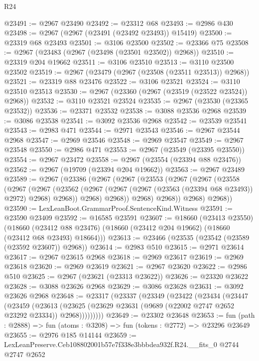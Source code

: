 \begin{lexlean}{R24}
\begin{coremodule}
@23491 := @2967 @23490
@23492 := @23312 @68
@23493 := @2986 @430
@23498 := @2967 (@2967 (@23491 (@23492 @23493)) @15419)
@23500 := @23319 @68 @23493
@23501 := @3106 @23500
@23502 := @23366 @75
@23508 := @2967 (@23483 (@2967 (@23498 (@23501 @23502)) @2968))
@23510 := @23319 @204 @19662
@23511 := @3106 @23510
@23513 := @3110 @23500 @23502
@23519 := @2967 (@23479 (@2967 (@23508 (@23511 @23513)) @2968))
@23521 := @23319 @88 @23476
@23522 := @3106 @23521
@23524 := @3110 @23510 @23513
@23530 := @2967 (@23360 (@2967 (@23519 (@23522 @23524)) @2968))
@23532 := @3110 @23521 @23524
@23535 := @2967 (@23530 (@23365 @23532))
@23536 := @23371 @23532
@23538 := @3088 @23536 @2968
@23539 := @3086 @23538
@23541 := @3092 @23536 @2968
@23542 := @23539 @23541
@23543 := @2983 @471
@23544 := @2971 @23543
@23546 := @2967 @23544 @2968
@23547 := @2969 @23546
@23548 := @2969 @23547
@23549 := @2967 @23548
@23550 := @2986 @471
@23553 := @2967 (@23549 (@23395 @23550))
@23554 := @2967 @23472
@23558 := @2967 (@23554 (@23394 @88 @23476))
@23562 := @2967 (@19709 (@23394 @204 @19662))
@23563 := @2967 @23489
@23589 := @2967
    (@23386
      (@2967
        (@2967
          (@23553
            (@2967
              (@2967
                (@23558
                  (@2967
                    (@2967
                      (@23562
                        (@2967 (@2967 (@2967 (@23563 (@23394 @68 @23493)) @2972) @2968) @2968))
                      @2968)
                    @2968))
                @2968)
              @2968))
          @2968)
        @2968))
@23590 := LexLeanBoot.GrammarProof.SentenceKind.Witness
@23591 := @23590 @23409
@23592 := @16585 @23591
@23607 := @18660
    (@23413 @23550)
    (@18660 (@23412 @88 @23476) (@18660 (@23412 @204 @19662) (@18660 (@23412 @68 @23493) @18664)))
@23613 := @23466 (@23535 (@23542 (@23589 (@23592 @23607)) @2968))
@23614 := @2983 @510
@23615 := @2971 @23614
@23617 := @2967 @23615 @2968
@23618 := @2969 @23617
@23619 := @2969 @23618
@23620 := @2969 @23619
@23621 := @2967 @23620
@23622 := @2986 @510
@23625 := @2967 (@23621 (@23313 @23622))
@23626 := @23320 @23622
@23628 := @3088 @23626 @2968
@23629 := @3086 @23628
@23631 := @3092 @23626 @2968
@23648 := @23317
    (@23337
      (@23349
        (@23422
          (@23434
            (@23447
              (@23459
                (@23613
                  (@23625 (@23629 @23631 (@9689 (@22002 @2747 @2652 @23292 @23334)) @2968)))))))))
@23649 := @23302 @23648
@23653 := fun (path : @2888) => fun (atoms : @3208) => fun (tokens : @2772) => @23296 @23649
@23655 := @2976 @185 @14144
@23659 := LexLeanPreserve.Ceb108802001b57e7f338e3bbbdea932f.R24.__fits_0 @2744 @2747 @2652

\end{coremodule}
\end{lexlean}
